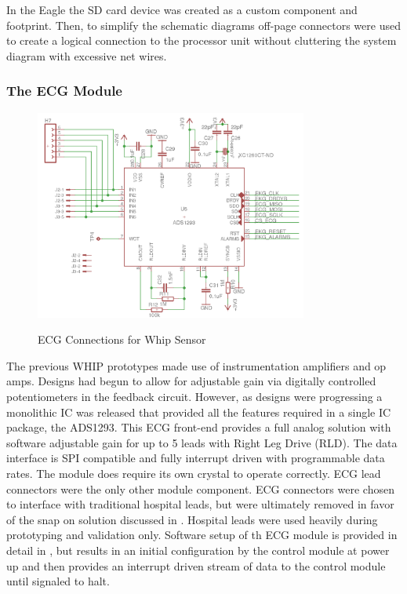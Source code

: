 In the Eagle the SD card device was created as a custom component and footprint. Then, to simplify the schematic diagrams off-page connectors were used to create a logical connection to the processor unit without cluttering the system diagram with excessive net wires.

\subsubsection{The ECG Module}
\begin{figure}
	\begin{center}
		\label{fig:Rev5_ECG}
		\includegraphics[scale=1,width=0.8\textwidth]{Images/Rev5_ECG.png} 
		\caption{ECG Connections for Whip Sensor}
	\end{center}
\end{figure}

The previous WHIP prototypes made use of instrumentation amplifiers and op amps. Designs had begun to allow for adjustable gain via digitally controlled potentiometers in the feedback circuit. However, as designs were progressing a monolithic IC was released that provided all the features required in a single IC package, the ADS1293.\cite{ADS1293} This ECG front-end provides a full analog solution with software adjustable gain for up to 5 leads with Right Leg Drive (RLD). The data interface is SPI compatible and fully interrupt driven with programmable data rates. The module does require its own crystal to operate correctly. ECG lead connectors were the only other module component. ECG connectors were chosen to interface with traditional hospital leads, but were ultimately removed in favor of the snap on solution discussed in . Hospital leads were used heavily during prototyping and validation only. Software setup of th ECG module is provided in detail in , but results in an initial configuration by the control module at power up and then provides an interrupt driven stream of data to the control module until signaled to halt.

